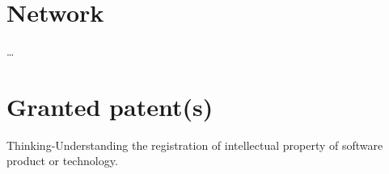 \documentclass{moderncv}
\begin{document}
\section{Network}

\ldots

\section{Granted patent(s)}

Thinking-Understanding the registration of intellectual property of software product or technology.
\end{document}
